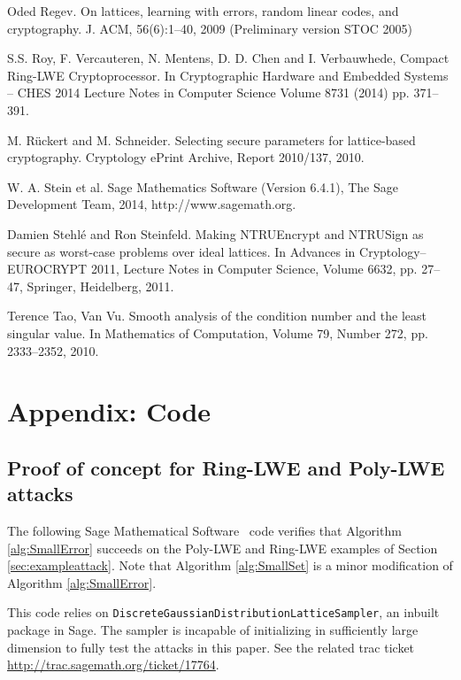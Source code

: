 \documentclass{llncs}
\newcommand{\<}{\langle}
\renewcommand{\>}{\rangle}
\begin{document}
\begin{thebibliography}{BBCE10}
 Oded Regev. On lattices, learning with errors, random linear codes, and cryptography. J. ACM, 56(6):1--40, 2009  (Preliminary version STOC 2005)

 S.S. Roy, F. Vercauteren, N. Mentens, D. D. Chen and I. Verbauwhede, Compact Ring-LWE Cryptoprocessor. In Cryptographic Hardware and Embedded Systems – CHES 2014
Lecture Notes in Computer Science Volume 8731 (2014) pp. 371--391.

 M. R\"uckert and M. Schneider. Selecting secure parameters for lattice-based cryptography.
Cryptology ePrint Archive, Report 2010/137, 2010.

 W. A. Stein et al. Sage Mathematics Software (Version 6.4.1),
   The Sage Development Team, 2014, http://www.sagemath.org.

 Damien Stehl\'e and Ron Steinfeld. Making NTRUEncrypt and NTRUSign as secure as worst-case problems over ideal lattices. In Advances in Cryptology--EUROCRYPT 2011,  Lecture Notes in Computer Science, Volume 6632, pp. 27--47, Springer, Heidelberg, 2011.


 Terence Tao, Van Vu.  Smooth analysis of the condition number and the least singular value. In Mathematics of Computation, Volume 79, Number 272,  pp. 2333--2352, 2010.

\end{thebibliography}

\appendix
\section{Appendix: Code}
\label{sec:code}
\subsection{Proof of concept for Ring-LWE and Poly-LWE attacks}


The following Sage Mathematical Software~\cite{S} code verifies that Algorithm \ref{alg:SmallError} succeeds on the Poly-LWE and Ring-LWE examples of Section \ref{sec:exampleattack}.  Note that Algorithm \ref{alg:SmallSet} is a minor modification of Algorithm \ref{alg:SmallError}.

This code relies on \texttt{DiscreteGaussianDistributionLatticeSampler}, an inbuilt package in Sage.  The sampler is incapable of initializing in sufficiently large dimension to fully test the attacks in this paper.   See the related trac ticket \url{http://trac.sagemath.org/ticket/17764}.
\end{document}
